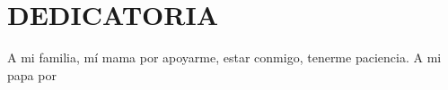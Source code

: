 \chapter*{DEDICATORIA}
A mi familia, mí mama por apoyarme, estar conmigo, tenerme paciencia. A mi papa por 
\thispagestyle{empty}

